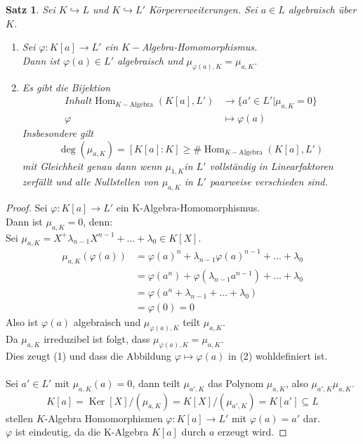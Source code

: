 \documentclass[10pt,a4paper]{article}
\newcommand{\la}{\ensuremath{\lambda}}
\newcommand{\Hom}{\operatorname{Hom}}
\newcommand{\Ker}{\ensuremath{\operatorname{Ker}}}
\newcounter{thm}[section]
\theoremstyle{definition}
\theoremstyle{plain}
\newtheorem{satz}[thm]{Satz}
\theoremstyle{remark}
\begin{document}
\begin{satz}\label{829satz}
	Sei $K\hookrightarrow L$ und $K\hookrightarrow L'$ Körpererweiterungen. Sei $a\in L$ algebraisch über $K$.
	\begin{enumerate}
		\item Sei $\varphi:K[a]\to L'$ ein $K-$Algebra-Homomorphismus.\\
		Dann ist $\varphi(a)\in L'$ algebraisch und $\mu_{\varphi(a),K}=\mu_{a,K}$.
		\item Es gibt die Bijektion
		\begin{align*}
		Inhalt\Hom_{K-\text{Algebra}}(K[a],L')&\rightarrow \{a'\in L'|\mu_{a,K}=0\}\\
		\varphi&\mapsto\varphi(a)
		\end{align*}
		Insbesondere gilt 
		\[\deg(\mu_{a,K})=[K[a]:K]\geq \#\Hom_{K-\text{Algebra}}(K[a],L')\]
		mit Gleichheit genau dann wenn $\mu_{1,K}$in $L'$ vollständig in Linearfaktoren zerfällt und alle Nullstellen von $\mu_{a,K}$ in $L'$ paarweise verschieden sind.
	\end{enumerate}
\end{satz}
\begin{proof}
	Sei $\varphi:K[a]\rightarrow L'$ ein K-Algebra-Homomorphismus.\\
	Dann ist $\mu_{a,K}=0$, denn:\\
	Sei $\mu_{a,K}=X^+\la_{n-1}X^{n-1}+...+\la_0\in K[X]$.
	\begin{align*}
	\mu_{a,K}(\varphi(a))&=\varphi(a)^n+\la_{n-1}\varphi(a)^{n-1}+...+\la_0\\
	&=\varphi(a^n)+\varphi\left(\la_{n-1}a^{n-1}\right)+...+\la_0\\
	&=\varphi\left(a^n+\la_{n-1}+...+\la_0\right)\\
	&=\varphi(0)=0
	\end{align*}
	Also ist $\varphi(a)$ algebraisch und $\mu_{\varphi(a),K}$ teilt $\mu_{a,K}$.\\
	Da $\mu_{a,K}$ irreduzibel ist folgt, dass $\mu_{\varphi(a),K}=\mu_{a,K}$.\\
	Dies zeugt (1) und dass die Abbildung $\varphi\mapsto \varphi(a)$ in (2) wohldefiniert ist.\\
	\\
	Sei $a'\in L'$ mit $\mu_{a,K}(a)=0$, dann teilt $\mu_{a',K}$ das Polynom $\mu_{a,K}$, also $\mu_{a',K}\mu_{a,K}$.
	\[K[a]=\Ker[X]/(\mu_{a,K})=K[X]/(\mu_{a',K})=K[a']\subseteq L\]
	stellen $K$-Algebra Homomorphismen $\varphi:K[a]\rightarrow L'$ mit $\varphi(a)=a'$ dar.\\
	$\varphi$ ist eindeutig, da die K-Algebra $K[a]$ durch $a$ erzeugt wird.
\end{proof}
\end{document}
